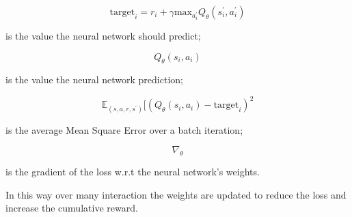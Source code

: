 \documentclass[14pt]{extarticle}
\begin{document}
\begin{flushleft}
\begin{equation} \label{eq:target}
\text{target}_i = r_i + \gamma\text{max}_{a_i^\prime}Q_{\theta}(s_i^{\prime},a_i^{\prime})
\end{equation}
\vspace{-13mm}
\begin{center}
is the value the neural network should predict;
\end{center}

\[Q_{\theta}(s_i,a_i)\]
\vspace{-13mm}
\begin{center}
is the value the neural network prediction;
\end{center}

\[\mathbb{E}_{(s,a,r,s^\prime)}[(Q_{\theta}(s_i,a_i) - \text{target}_i)^2\] 
\vspace{-12mm}
\begin{center}
is the average Mean Square Error over a batch iteration;
\end{center}

\[\nabla_{\theta}\]
\vspace{-13mm}
\begin{center}
is the gradient of the loss w.r.t the neural network's weights.
\end{center}

In this way over many interaction the weights are updated to reduce the loss and increase the cumulative reward. 
\end{flushleft}
\end{document}
